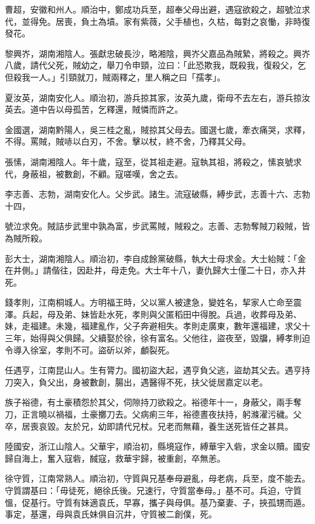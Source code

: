\begin{pinyinscope}
曹超，安徽和州人。順治中，鄭成功兵至，超奉父母出避，遇寇欲殺之，超號泣求代，並得免。居喪，負土為墳。家有紫薇，父手植也，久枯，每對之哀慟，非時復發花。

黎興岕，湖南湘陰人。張獻忠破長沙，略湘陰，興岕父嘉品為賊縶，將殺之。興岕八歲，請代父死，賊幼之，舉刀令申頸，泣曰：「此恐欺我，既殺我，復殺父，乞但殺我一人。」引頸就刀，賊兩釋之，里人稱之曰「孺孝」。

夏汝英，湖南安化人。順治初，游兵掠其家，汝英九歲，衛母不去左右，游兵掠汝英去。道中告以母孤苦，乞釋還，賊憐而許之。

金國選，湖南黔陽人，吳三桂之亂，賊掠其父母去。國選七歲，牽衣痛哭，求釋，不得。罵賊，賊哧以白刃，不舍。擊以杖，終不舍，乃釋其父母。

張愫，湖南湘陰人。年十歲，寇至，從其祖走避。寇執其祖，將殺之，愫哀號求代，身蔽祖，被數創，不顧。寇嗟嘆，舍之去。

李志善、志勃，湖南安化人。父步武。諸生。流寇破縣，縛步武，志善十六、志勃十四，

號泣求免。賊詰步武里中孰為富，步武罵賊，賊殺之。志善、志勃奪賊刀殺賊，皆為賊所殺。

彭大士，湖南湘陰人。順治初，李自成餘黨破縣，執大士母求金。大士紿賊：「金在井側。」請偕往，因赴井，母走免。大士年十八，妻仇歸大士僅二十日，亦入井死。

錢孝則，江南桐城人。方明福王時，父以黨人被逮急，變姓名，挈家人亡命至震澤。兵起，母及弟、妹皆赴水死，孝則與父匿稻田中得脫。兵過，收葬母及弟、妹，走福建。未幾，福建亂作，父子奔避相失。孝則走廣東，數年還福建，求父十三年，始得與父俱歸。父續娶於徐，徐有富名。父他往，盜夜至，毀牖，縛孝則迫令導入徐室，孝則不可。盜斫以斧，顱裂死。

任遇亨，江南昆山人。生有膂力。國初盜大起，遇亨負父逃，盜劫其父去。遇亨持刀突入，負父出，身被數創，腸出，遇醫得不死，扶父徙居嘉定以老。

族子裕德，有土豪積怨於其父，伺隙持刀欲殺之。裕德年十一，身蔽父，兩手奪刀，正言曉以禍福，土豪擲刀去。父病痢三年，裕德晝夜扶持，躬滌濯污穢。父卒，居喪哀毀。友於兄，幼即請代兄杖。兄老而無藉，養生送死皆任之甚具。

陸國安，浙江山陰人。父華宇，順治初，縣境寇作，縛華宇入砦，求金以贖。國安歸自海上，奮入寇砦，馘寇，救華宇歸，被重創，卒無恙。

徐守質，江南常熟人。順治初，守質與兄基奉母避亂，母老病，兵至，度不能去。守質謂基曰：「毋徒死，絕徐氏後。兄速行，守質當奉母。」基不可。兵迫，守質慍，促基行。守質有妹適袁氏，早寡，攜子與母俱。基乃棄妻、子，挾孤甥而遁。事定，基還，母與袁氏妹俱自沉井，守質被二創僕，死。


\end{pinyinscope}
